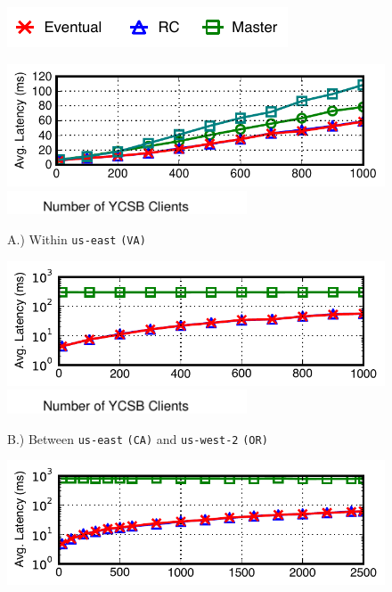 \begin{figure}[t!]
\begin{center}
\includegraphics[width=.4\columnwidth]{figs/strategylegendthree.pdf}\vspace{-1.5em}
\begin{center}
\includegraphics[width=\figscale\columnwidth]{figs/finals/2lan-threads-lats.pdf}
\vspace{-.5em}
\includegraphics[width=2.8in]{figs/hat-ycsb-label.pdf}
\begin{center}{A.) Within \texttt{us-east} \texttt{(VA)}}\end{center}
\end{center}
\begin{center}
\includegraphics[width=\figscale\columnwidth]{figs/finals/2wan-threads-lats-log.pdf}\vspace{-.5em}
\includegraphics[width=2.8in]{figs/hat-ycsb-label.pdf}
\end{center}
\begin{center}{B.) Between \texttt{us-east} \texttt{(CA)} and 
    \texttt{us-west-2} \texttt{(OR)}}\end{center}\vspace{-.5em}
\includegraphics[width=\figscale\columnwidth]{figs/finals/5wan-threads-lats-log.pdf}\vspace{-.5em}

\end{center}
\end{figure}
